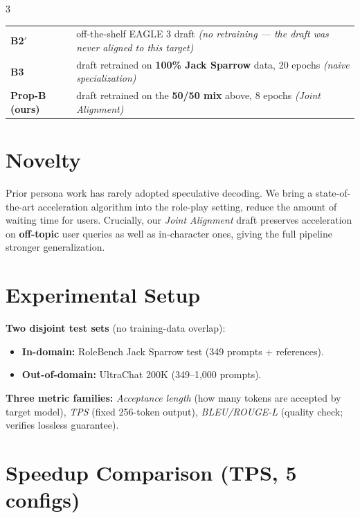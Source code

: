 \documentclass[9pt]{extarticle}
\begin{document}
\begin{multicols}{3}
\small
\begin{tabularx}{\linewidth}{@{}lX@{}}
\toprule
\textbf{B2$'$} & off-the-shelf EAGLE 3 draft \emph{(no retraining --- the draft was never aligned to this target)} \\
\textbf{B3}    & draft retrained on \textbf{100\% Jack Sparrow} data, 20 epochs \emph{(naive specialization)} \\
\rowcolor{lightgray}\textbf{Prop-B (ours)} & draft retrained on the \textbf{50/50 mix} above, 8 epochs \emph{(Joint Alignment)} \\
\bottomrule
\end{tabularx}
\normalsize

\section{Novelty}

Prior persona work has rarely adopted speculative decoding. We bring a state-of-the-art acceleration algorithm into the role-play setting, reduce the amount of waiting time for users. Crucially, our \emph{Joint Alignment} draft preserves acceleration on \textbf{off-topic} user queries as well as in-character ones, giving the full pipeline stronger generalization.

\section{Experimental Setup}

\textbf{Two disjoint test sets} (no training-data overlap):
\begin{itemize}
  \item \textbf{In-domain:} RoleBench Jack Sparrow test (349 prompts + references).
  \item \textbf{Out-of-domain:} UltraChat 200K (349--1{,}000 prompts).
\end{itemize}

\textbf{Three metric families:} \textit{Acceptance length} (how many tokens are accepted by target model), \textit{TPS} (fixed 256-token output), \textit{BLEU/ROUGE-L} (quality check; verifies lossless guarantee).


\section{Speedup Comparison \normalfont\small (TPS, 5 configs)}


\end{multicols}
\end{document}
